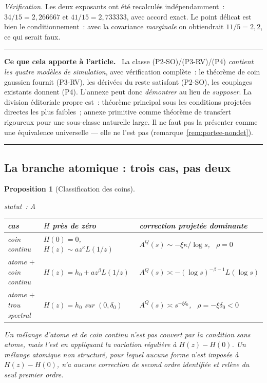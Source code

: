 \documentclass[11pt]{article}
\theoremstyle{plain}
\newtheorem{proposition}[theoreme]{Proposition}
\theoremstyle{definition}
\theoremstyle{remark}
\newcommand{\1}{\mathbf 1}
\newcommand{\statut}[1]{%
  \nopagebreak\par\nopagebreak
  \hfill{\normalfont\footnotesize\textcolor{gris}{statut~: #1}}%
  \par\nopagebreak\vspace{-2pt}}
\newenvironment{apport}
  {\par\medskip\noindent\begingroup\color{bleu}\rule{\linewidth}{0.6pt}\par
   \nobreak\vspace{2pt}\noindent\textbf{Ce que cela apporte à l'article.}\ \normalcolor}
  {\par\vspace{2pt}\noindent\textcolor{bleu}{\rule{\linewidth}{0.6pt}}\endgroup\par\medskip}
\begin{document}
\noindent
\emph{Vérification.} Les deux exposants ont été recalculés
indépendamment~: $34/15=2{,}266667$ et $41/15=2{,}733333$, avec accord
exact. Le point délicat est bien le conditionnement~: avec la covariance
\emph{marginale} on obtiendrait $11/5=2{,}2$, ce qui serait faux.

\begin{apport}
La classe (P2-SO)/(P3-RV)/(P4) \emph{contient les quatre modèles de
simulation}, avec vérification complète~: le théorème de coin gaussien
fournit (P3-RV), les dérivées du reste satisfont (P2-SO), les couplages
existants donnent (P4). L'annexe peut donc \emph{démontrer} au lieu de
\emph{supposer}. La division éditoriale propre est~: théorème principal
sous les conditions projetées directes les plus faibles~; annexe
primitive comme théorème de transfert rigoureux pour une sous-classe
naturelle large. Il ne faut pas la présenter comme une équivalence
universelle --- elle ne l'est pas (remarque~\ref{rem:portee-nondet}).
\end{apport}

\subsection{La branche atomique : trois cas, pas deux}

\begin{proposition}[Classification des coins]
\label{prop:atome}
\statut{A}
\begin{center}
\begin{tabular}{@{}lll@{}}
\toprule
cas & $H$ près de zéro & correction projetée dominante\\
\midrule
coin continu & $H(0)=0$, $H(z)\sim az^\kappa L(1/z)$ &
  $A^Q(s)\sim-\xi\kappa/\log s$, \ $\rho=0$\\
atome $+$ coin continu & $H(z)=h_0+az^\beta L(1/z)$ &
  $A^Q(s)\asymp-(\log s)^{-\beta-1}L(\log s)$\\
atome $+$ trou spectral & $H(z)=h_0$ sur $(0,\delta_0)$ &
  $A^Q(s)\asymp s^{-\xi\delta_0}$, \ $\boxed{\rho=-\xi\delta_0<0}$\\
\bottomrule
\end{tabular}
\end{center}
Un mélange d'atome et de coin continu n'est \emph{pas} couvert par la
condition sans atome, mais l'est en appliquant la variation régulière à
$H(z)-H(0)$. Un mélange atomique \emph{non structuré}, pour lequel aucune
forme n'est imposée à $H(z)-H(0)$, n'a aucune correction de second ordre
identifiée et relève du seul premier ordre.
\end{proposition}
\end{document}
